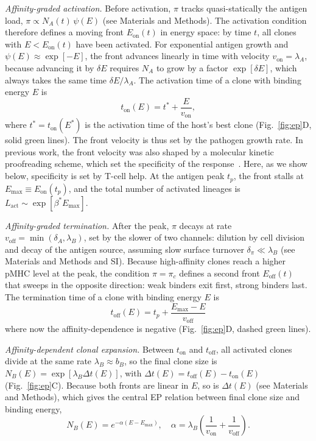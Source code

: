 \documentclass[aps, pre, twocolumn, 10pt, groupedaddress, superscriptaddress, linenumbers]{revtex4-2}
\newcommand{\EQ}{\begin{equation}}
\newcommand{\EE}{\end{equation}}
\newcommand{\on}{\text{on}}
\newcommand{\off}{\text{off}}
\newcommand{\act}{\text{act}}
\newcommand{\DG}{E}
\newcommand{\lam}{\lambda}
\begin{document}
\textit{Affinity-graded activation.}
Before activation, $\pi$ tracks quasi-statically the antigen load, $\pi \propto N_A(t)\,\psi(\DG)$ (see Materials and Methods).
The activation condition therefore defines a moving front $\DG_\on(t)$ in energy space: by time $t$, all clones with $\DG < \DG_\on(t)$ have been activated.
For exponential antigen growth and $\psi(\DG)\approx \exp{[-\DG]}$, the front advances linearly in time with velocity $v_\on=\lam_A$, because advancing it by $\delta\DG$ requires $N_A$ to grow by a factor $\exp{[\delta\DG]}$, which always takes the same time $\delta\DG/\lam_A$.
The activation time of a clone with binding energy $\DG$ is
\EQ
t_\on(\DG) = t^* + \frac{\DG}{v_\on},
\label{eq:t_on}
\EE
where $t^* = t_\on(\DG^*)$ is the activation time of the host's best clone (Fig.~\ref{fig:ep}D, solid green lines).
The front velocity is thus set by the pathogen growth rate.
In previous work, the front velocity was also shaped by a molecular kinetic proofreading scheme, which set the specificity of the response~\cite{MoranTovar_2024_Primary}.
Here, as we show below, specificity is set by T-cell help.
At the antigen peak $t_p$, the front stalls at $\DG_{\max} \equiv \DG_\on(t_p)$, and the total number of activated lineages is $L_\act \sim \exp{[\beta^* \DG_{\max}]}$.

\textit{Affinity-graded termination.}
After the peak, $\pi$ decays at rate $v_\text{off} = \min(\delta_A, \lambda_B)$, set by the slower of two channels: dilution by cell division and decay of the antigen source, assuming slow surface turnover $\delta_\pi \ll \lambda_B$ (see Materials and Methods and SI).
Because high-affinity clones reach a higher pMHC level at the peak, the condition $\pi = \pi_c$ defines a second front $\DG_\off(t)$ that sweeps in the opposite direction: weak binders exit first, strong binders last.
The termination time of a clone with binding energy $\DG$ is 
\EQ
t_\off(\DG) = t_p + \frac{\DG_{\max} - \DG}{v_\off}
\label{eq:t_off}
\EE
where now the affinity-dependence is negative (Fig.~\ref{fig:ep}D, dashed green lines).

\textit{Affinity-dependent clonal expansion.}
Between $t_\on$ and $t_\off$, all activated clones divide at the same rate $\lam_B \approx b_B$, so the final clone size is $N_B(\DG) = \exp[\lam_B \Delta t(\DG)]$, with $\Delta t(\DG) = t_\off(\DG) - t_\on(\DG)$ (Fig.~\ref{fig:ep}C).
Because both fronts are linear in $\DG$, so is $\Delta t(\DG)$ (see Materials and Methods), which gives the central EP relation between final clone size and binding energy,
\EQ
N_B(\DG) = e^{-\alpha(\DG-\DG_{\max})},
\quad
\alpha = \lam_B\left(\frac{1}{v_\on} + \frac{1}{v_\off}\right).
\label{eq:alpha}
\EE
\end{document}
